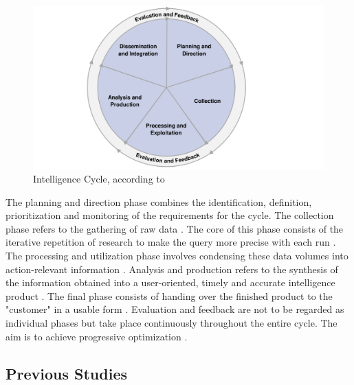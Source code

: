 \documentclass[10pt]{article}
\begin{document}
\begin{figure}[h]
    \centering
    \includegraphics[clip,width=0.8\linewidth]{PDF/images/crop_Intelligence Cycle}
    \caption{Intelligence Cycle, according to \cite{JointChiefsofStaffU.S.Army.2013}}
    \label{fig: intelligence cycle}
\end{figure}

The planning and direction phase combines the identification, definition, prioritization and monitoring
of the requirements for the cycle\cite{JointChiefsofStaffU.S.Army.2013}.
The collection phase refers to the gathering of raw data \cite{CentralIntelligenceAgency.1987}.
The core of this phase consists of the iterative repetition of research
\cite{NorthAtlanticTreatyOrganization.2001} to make the query more precise with each run
\cite{PastorGalindo.2020}. The processing and utilization phase involves condensing
these data volumes into action-relevant information
\cite{JointChiefsofStaffU.S.Army.2013}.
Analysis and production refers to the synthesis of the information obtained into a
user-oriented, timely and accurate intelligence product
\cite{Hwang.2022, NorthAtlanticTreatyOrganization.2001}.
The final phase consists of handing over the finished product to the "customer" in a
usable form \cite{CentralIntelligenceAgency.2023, Williams.2018}.
Evaluation and feedback are not to be regarded as individual phases
but take place continuously throughout the entire cycle. The aim is to achieve progressive optimization
\cite{JointChiefsofStaffU.S.Army.2013, NorthAtlanticTreatyOrganization.2001}.

\subsection{Previous Studies}
\end{document}
